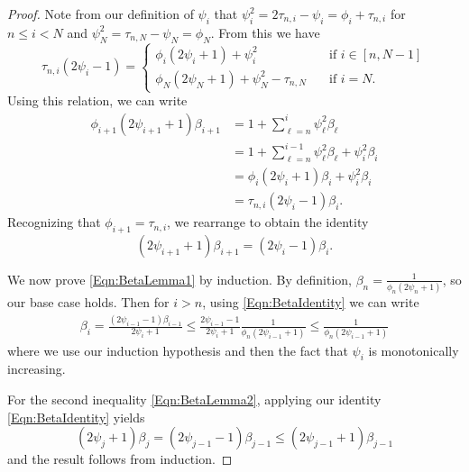 \documentclass[10pt,a4paper]{amsart}
\begin{document}
\begin{proof}
    Note from our definition of $\psi_i$ that $\psi_i^2 = 2 \tau_{n,i} - \psi_i = \phi_i + \tau_{n,i}$ for $n \leq i < N$ and $\psi_N^2 = \tau_{n,N} - \psi_N = \phi_N$. From this we have
    \begin{equation*}
        \tau_{n,i}(2\psi_i - 1) = \begin{cases}
            \phi_i(2\psi_i+1)+\psi_i^2 \quad & \text{if } i \in [n, N-1] \\
            \phi_N(2\psi_N+1)+\psi_N^2 - \tau_{n,N} \quad & \text{if } i = N.
        \end{cases}
    \end{equation*}
Using this relation, we can write
\begin{align*}
    \phi_{i+1}(2 \psi_{i+1} + 1) \beta_{i+1} &= 1 + \sum_{\ell = n}^i \psi_\ell^2 \beta_\ell \\
    & = 1 + \sum_{\ell = n}^{i-1} \psi_\ell^2 \beta_\ell + \psi_i^2 \beta_i \\
    & = \phi_{i}(2 \psi_{i} + 1) \beta_{i} + \psi_i^2 \beta_i \\
    & = \tau_{n,i}(2 \psi_i - 1) \beta_i.
\end{align*}
Recognizing that $\phi_{i+1} = \tau_{n,i}$, we rearrange to obtain the identity 
\begin{equation} \label{Eqn:BetaIdentity}
    (2 \psi_{i+1} + 1) \beta_{i+1} = (2 \psi_i -1) \beta_i.
\end{equation}

We now prove \eqref{Eqn:BetaLemma1} by induction. By definition, $\beta_n = \frac{1}{\phi_n(2 \psi_n+1)}$, so our base case holds. Then for $i>n$, using \eqref{Eqn:BetaIdentity} we can write
\begin{align*}
    \beta_i = \frac{(2 \psi_{i-1} -1)\beta_{i-1}}{2 \psi_i + 1} \leq \frac{2 \psi_{i-1} - 1}{2\psi_i + 1} \frac{1}{\phi_n (2 \psi_{i-1} + 1)} \leq \frac{1}{\phi_n (2 \psi_{i-1} + 1)}
\end{align*}
where we use our induction hypothesis and then the fact that $\psi_i$ is monotonically increasing.

For the second inequality \eqref{Eqn:BetaLemma2}, applying our identity \eqref{Eqn:BetaIdentity} yields
\begin{equation*}
    (2 \psi_j + 1)\beta_j = (2 \psi_{j-1} - 1) \beta_{j-1} \leq (2 \psi_{j-1} + 1) \beta_{j-1}
\end{equation*}
and the result follows from induction.
\end{proof}
\end{document}
